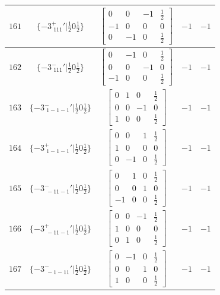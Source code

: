 \documentclass[fleqn,8pt]{jsarticle}
\begin{document}
\begin{longtable}{ccccc}
$ 161 $ & $ \{-3^{+}_{\,\,111}{}'|\frac{1}{2} 0 \frac{1}{2}\} $ & $ \begin{bmatrix} 0 & 0 & -1 & \frac{1}{2} \\ -1 & 0 & 0 & 0 \\ 0 & -1 & 0 & \frac{1}{2} \end{bmatrix} $ & $ -1 $ & $ -1 $ \\ \hline
$ 162 $ & $ \{-3^{-}_{\,\,111}{}'|\frac{1}{2} 0 \frac{1}{2}\} $ & $ \begin{bmatrix} 0 & -1 & 0 & \frac{1}{2} \\ 0 & 0 & -1 & 0 \\ -1 & 0 & 0 & \frac{1}{2} \end{bmatrix} $ & $ -1 $ & $ -1 $ \\ \hline
$ 163 $ & $ \{-3^{-}_{\,\,1-1-1}{}'|\frac{1}{2} 0 \frac{1}{2}\} $ & $ \begin{bmatrix} 0 & 1 & 0 & \frac{1}{2} \\ 0 & 0 & -1 & 0 \\ 1 & 0 & 0 & \frac{1}{2} \end{bmatrix} $ & $ -1 $ & $ -1 $ \\ \hline
$ 164 $ & $ \{-3^{+}_{\,\,1-1-1}{}'|\frac{1}{2} 0 \frac{1}{2}\} $ & $ \begin{bmatrix} 0 & 0 & 1 & \frac{1}{2} \\ 1 & 0 & 0 & 0 \\ 0 & -1 & 0 & \frac{1}{2} \end{bmatrix} $ & $ -1 $ & $ -1 $ \\ \hline
$ 165 $ & $ \{-3^{-}_{\,\,-11-1}{}'|\frac{1}{2} 0 \frac{1}{2}\} $ & $ \begin{bmatrix} 0 & 1 & 0 & \frac{1}{2} \\ 0 & 0 & 1 & 0 \\ -1 & 0 & 0 & \frac{1}{2} \end{bmatrix} $ & $ -1 $ & $ -1 $ \\ \hline
$ 166 $ & $ \{-3^{+}_{\,\,-11-1}{}'|\frac{1}{2} 0 \frac{1}{2}\} $ & $ \begin{bmatrix} 0 & 0 & -1 & \frac{1}{2} \\ 1 & 0 & 0 & 0 \\ 0 & 1 & 0 & \frac{1}{2} \end{bmatrix} $ & $ -1 $ & $ -1 $ \\ \hline
$ 167 $ & $ \{-3^{-}_{\,\,-1-11}{}'|\frac{1}{2} 0 \frac{1}{2}\} $ & $ \begin{bmatrix} 0 & -1 & 0 & \frac{1}{2} \\ 0 & 0 & 1 & 0 \\ 1 & 0 & 0 & \frac{1}{2} \end{bmatrix} $ & $ -1 $ & $ -1 $ \\ \hline

\end{longtable}
\end{document}

